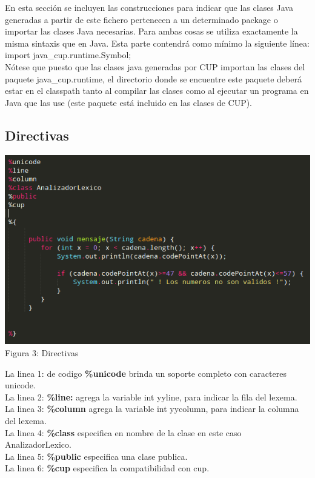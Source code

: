 \documentclass[a4paper,openright,12pt]{article}
\begin{document}
En esta sección se incluyen las construcciones para indicar que las clases Java generadas a partir de este fichero pertenecen a un determinado package o importar las clases Java necesarias. Para ambas cosas se utiliza exactamente la misma sintaxis que en Java. Esta parte contendrá como mínimo la siguiente línea:\\

import java\_cup.runtime.Symbol; \\
Nótese que puesto que las clases java generadas por CUP importan las clases del paquete java\_cup.runtime, el directorio donde se encuentre este paquete deberá estar en el classpath tanto al compilar las clases como al ejecutar un programa en Java que las use (este paquete está incluido en las clases de CUP).\\


\subsection{Directivas}

\begin{center}
\includegraphics[height=0.4\textheight]{directivas.png}
\\
Figura 3: Directivas
\end{center}

La linea 1: de codigo \textbf{\%unicode} brinda un soporte completo con caracteres unicode.\\
La linea 2: \textbf{\%line:} agrega la variable int yyline, para indicar la fila del lexema.\\
La linea 3: \textbf{ \%column}  agrega la variable int yycolumn, para indicar la columna del lexema.\\
La linea 4: \textbf{ \%class}  especifica en nombre de la clase en este caso AnalizadorLexico.\\
La linea 5: \textbf{ \%public}  especifica una clase publica.\\
La linea 6: \textbf{ \%cup}  especifica la compatibilidad con cup.\\
\end{document}
